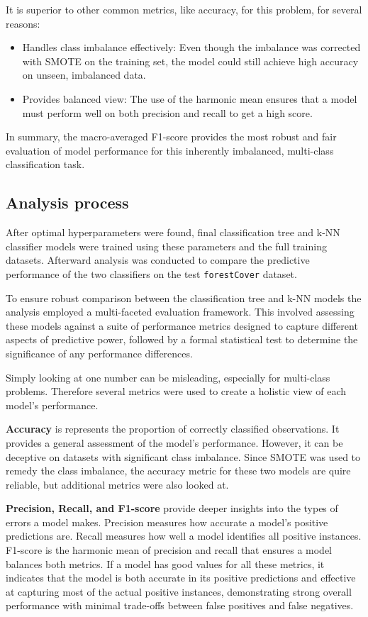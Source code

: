 \documentclass[conference]{IEEEtran}
\begin{document}
It is superior to other common metrics, like accuracy, for this problem, for several reasons:

\begin{itemize}
    \item Handles class imbalance effectively: Even though the imbalance was corrected with SMOTE on the training set, the model could still achieve high accuracy on unseen, imbalanced data.
    \item Provides balanced view: The use of the harmonic mean ensures that a model must perform well on both precision and recall to get a high score.
\end{itemize}

In summary, the macro-averaged F1-score provides the most robust and fair evaluation of model performance for this inherently imbalanced, multi-class classification task.

\subsection{\textbf{Analysis process}}

After optimal hyperparameters were found, final classification tree and k-NN classifier models were trained using these parameters and the full training datasets. Afterward analysis was conducted to compare the predictive performance of the two classifiers on the test \texttt{forestCover} dataset.

To ensure robust comparison between the classification tree and k-NN models the analysis employed a multi-faceted evaluation framework. This involved assessing these models against a suite of performance metrics designed to capture different aspects of predictive power, followed by a formal statistical test to determine the significance of any performance differences.

Simply looking at one number can be misleading, especially for multi-class problems. Therefore several metrics were used to create a holistic view of each model's performance.

\textbf{Accuracy} is represents the proportion of correctly classified observations. It provides a general assessment of the model's performance. However, it can be deceptive on datasets with significant class imbalance. Since SMOTE was used to remedy the class imbalance, the accuracy metric for these two models are quire reliable, but additional metrics were also looked at.

\textbf{Precision, Recall, and F1-score} provide deeper insights into the types of errors a model makes. Precision measures how accurate a model's positive predictions are. Recall measures how well a model identifies all positive instances. F1-score is the harmonic mean of precision and recall that ensures a model balances both metrics. If a model has good values for all these metrics, it indicates that the model is both accurate in its positive predictions and effective at capturing most of the actual positive instances, demonstrating strong overall performance with minimal trade-offs between false positives and false negatives.
\end{document}
